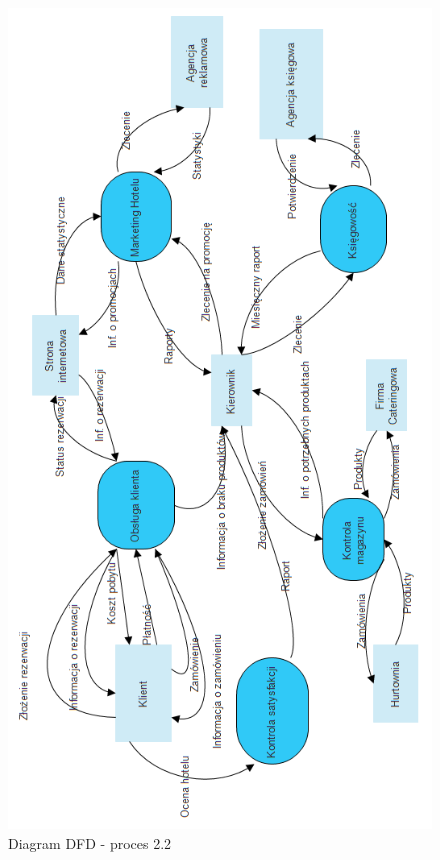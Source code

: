 \documentclass[a4paper, 11pt]{article}
\begin{document}
	\begin{figure}[H]%
			\center
			\includegraphics[scale=0.7]{Img/DFDpoziom0.png}
			\caption{Diagram DFD - proces 2.2}
	\end{figure}
\end{document}
